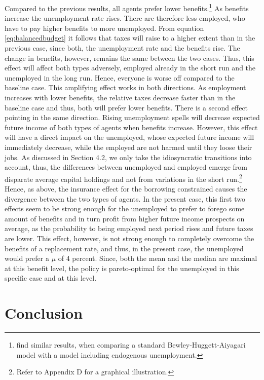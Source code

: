 \documentclass[a4paper,11pt]{article}
\begin{document}
Compared to the previous results, all agents prefer lower benefits.\footnote{\cite{KrusellMukoyamaSahin} find similar results, when comparing a standard Bewley-Huggett-Aiyagari model with a model including endogenous unemployment.} As benefits increase the unemployment rate rises. There are therefore less employed, who have to pay higher benefits to more unemployed. From equation \eqref{eq:balancedbudget} it follows that taxes will raise to a higher extent than in the previous case, since both, the unemployment rate and the benefits rise. The change in benefits, however, remains the same between the two cases. Thus, this effect will affect both types adversely, employed already in the short run and the unemployed in the long run. Hence, everyone is worse off compared to the baseline case. This amplifying effect works in both directions. As employment increases with lower benefits, the relative taxes decrease faster than in the baseline case and thus, both will prefer lower benefits.
There is a second effect pointing in the same direction. Rising unemployment spells will decrease expected future income of both types of agents when benefits increase. However, this effect will have a direct impact on the unemployed, whose expected future income will immediately decrease, while the employed are not harmed until they loose their jobs. As discussed in Section 4.2, we only take the idiosyncratic transitions into account, thus, the differences between unemployed and employed emerge from disparate average capital holdings and not from variations in the short run.\footnote{Refer to Appendix D for a graphical illustration.} 
Hence, as above, the insurance effect for the borrowing constrained causes the divergence between the two types of agents. 
\linebreak \linebreak
In the present case, this first two effects seem to be strong enough for the unemployed to prefer to forego some amount of benefits and in turn profit from higher future income prospects on average, as the probability to being employed next period rises and future taxes are lower. This effect, however, is not strong enough to completely overcome the benefits of a replacement rate, and thus, in the present case, the unemployed would prefer a $\mu$ of 4 percent. Since, both the mean and the median are maximal at this benefit level, the policy is pareto-optimal for the unemployed in this specific case and at this level. 


\section{Conclusion}
\end{document}
